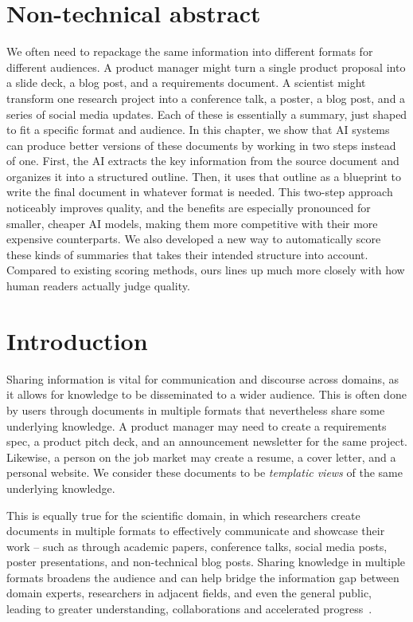 \section*{Non-technical abstract}
We often need to repackage the same information into different formats for different audiences. A product manager might turn a single product proposal into a slide deck, a blog post, and a requirements document. A scientist might transform one research project into a conference talk, a poster, a blog post, and a series of social media updates. Each of these is essentially a summary, just shaped to fit a specific format and audience.
In this chapter, we show that AI systems can produce better versions of these documents by working in two steps instead of one. First, the AI extracts the key information from the source document and organizes it into a structured outline. Then, it uses that outline as a blueprint to write the final document in whatever format is needed. This two-step approach noticeably improves quality, and the benefits are especially pronounced for smaller, cheaper AI models, making them more competitive with their more expensive counterparts.
We also developed a new way to automatically score these kinds of summaries that takes their intended structure into account. Compared to existing scoring methods, ours lines up much more closely with how human readers actually judge quality.


\section{Introduction}
Sharing information is vital for communication and discourse across domains, as it allows for knowledge to be disseminated to a wider audience. This is often done by users through documents in multiple formats that nevertheless share some underlying knowledge. A product manager may need to create a requirements spec, a product pitch deck, and an announcement newsletter for the same project. Likewise, a person on the job market may create a resume, a cover letter, and a personal website. We consider these documents to be \textit{templatic views} of the same underlying knowledge.

This is equally true for the scientific domain, in which researchers create documents in multiple formats to effectively communicate and showcase their work -- such as through academic papers, conference talks, social media posts, poster presentations, and non-technical blog posts. Sharing knowledge in multiple formats broadens the audience and can help bridge the information gap between domain experts, researchers in adjacent fields, and even the general public, leading to greater understanding, collaborations and accelerated progress~\cite{Bornmann2014GrowthRO}.


